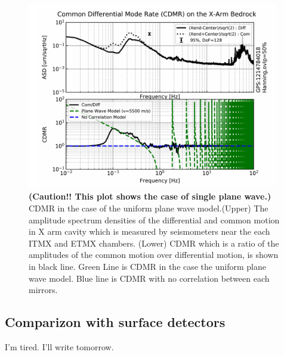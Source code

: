 \documentclass[a4paper,12pt]{book}
\begin{document}
\begin{figure}[H]
  \begin{center}
    \includegraphics[width=11.0cm]{./img_cdmr_xarm.png}
  \end{center}
  \caption{\textbf{(Caution!! This plot shows the case of single plane wave.)} CDMR in the case of the uniform plane wave model.(Upper) The amplitude spectrum densities of the differential and common motion in X arm cavity which is measured by seismometers near the each ITMX and ETMX chambers. (Lower) CDMR which is a ratio of the amplitudes of the common motion over differential motion, is shown in black line. Green Line is CDMR in the case the uniform plane wave model. Blue line is CDMR with no correlation between each mirrors.}\label{img:img_cdmr_xarm}
\end{figure}


\subsection{Comparizon with surface detectors}
I'm tired. I'll write tomorrow.
\end{document}
